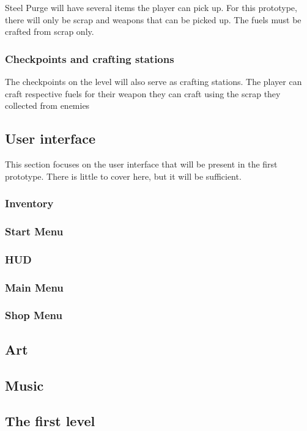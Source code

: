 \documentclass[../Main.tex]{subfiles}
\begin{document}
Steel Purge will have several items the player can pick up. For this prototype, there will only be scrap and weapons that can be picked up. The fuels must be crafted from scrap only.

\subsubsection{Checkpoints and crafting stations}

The checkpoints on the level will also serve as crafting stations. The player can craft respective fuels for their weapon they can craft using the scrap they collected from enemies

\subsection{User interface}

This section focuses on the user interface that will be present in the first prototype. There is little to cover here, but it will be sufficient. 

\subsubsection{Inventory}
\subsubsection{Start Menu}
\subsubsection{HUD}
\subsubsection{Main Menu}
\subsubsection{Shop Menu}

\subsection{Art}

\subsection{Music}

\subsection{The first level}
\end{document}
